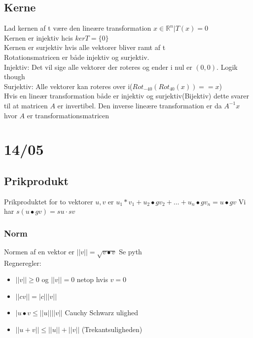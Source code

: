 \documentclass[a4paper,fleqn]{report}
\newcommand{\RR}{\mathbb{R}}
\begin{document}
	\section{Kerne}
	Lad kernen af t være den lineære transformation $x\in\RR^n | T(x) = 0$\\
	Kernen er injektiv hcis $ker T = \{0\}$\\
	Kernen er surjektiv hvis alle vektorer bliver ramt af t\\

	Rotationsmatricen er både injektiv og surjektiv.\\
	Injektiv: Det vil sige alle vektorer der roteres og ender i nul er $(0,0)$. Logik though\\
	Surjektiv: Alle vektorer kan roteres over i($Rot_{-40}(Rot_{40}(x)) == x$)\\

	Hvis en lineær transformation både er injektiv og surjektiv(Bijektiv) dette svarer til
	at matricen $A$ er invertibel. Den inverse lineære transformation er da $A^{-1}x$ hvor $A$
	er transformationsmatricen\\

	\chapter{14/05}
	\section{Prikprodukt}
	Prikproduktet for to vektorer $u,v$ er 
	$u_1*v_1 + u_2\bullet g v_2 + \dots + u_n\bullet g v_n = u \bullet g v$
	Vi har $s(u\bullet g v) = su \cdot sv$\\

	\subsection{Norm}
	Normen af en vektor er $||v|| = \sqrt{v\bullet v}$ Se pyth\\

	Regneregler:
	\begin{itemize}
		\item $||v|| \geq 0$ og $||v|| = 0$ netop hvis $v=0$
		\item $||cv|| = |c|||v||$
		\item $|u\bullet v \leq ||u||||v||$ Cauchy Schwarz ulighed
		\item $||u + v|| \leq ||u|| + ||v||$ (Trekantsuligheden)
	\end{itemize}
\end{document}
